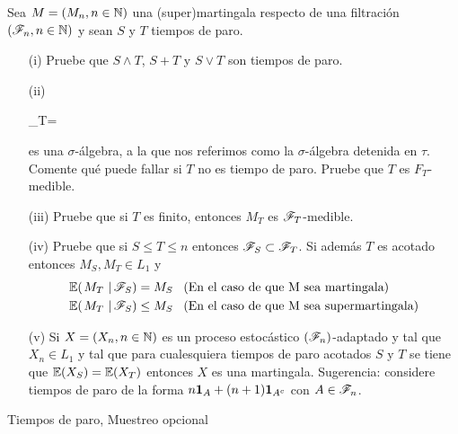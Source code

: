 \begin{problema}
	Sea $M=\left( M_n,n\in\mathbb{N}\right) $ una (super)martingala respecto de una filtraci\'on $\left( \mathscr{F}_n,n\in\mathbb{N}\right) $ y sean $S$ y $T$ tiempos de paro.
	
\begin{enumerate}
                \item[(i)] 
                	Pruebe que $S\wedge T$, $S+T$ y $S\vee T$ son tiempos de paro.
                
                \item[(ii)] 
                	\begin{esn}
                		\F_T=
                	\end{esn}
                	es una $\sigma$-\'algebra, a la que nos referimos como la $\sigma$-\'algebra 
                	detenida en $\tau$. Comente qu\'e puede fallar si $T$ no es tiempo de paro. 
                	Pruebe que $T$ es $F_T$-medible. 
                
                \item[(iii)] 
                	Pruebe que si $T$ es finito, entonces $M_T$ es $\mathscr{F}_T$-medible.
                
                \item[(iv)] 
                	Pruebe que si $S\leq T\leq n$ entonces $\mathscr{F}_S\subset\mathscr{F}_T$. Si adem\'as $T$ es acotado entonces $M_S, M_T\in L_1$ y 
                	\begin{align*}
						\espc{M_T}{\F_S} = M_S &\mbox{\;\;\;(En el caso de que M sea martingala)} \\
						\espc{M_T}{\F_S}\leq M_S &\mbox{\;\;\;(En el caso de que M sea supermartingala)}                 	
                	\end{align*}

                \item[(v)] 
                	Si $X=\left( X_n,n\in\mathbb{N}\right) $ es un proceso estoc\'astico $\left( \mathscr{F}_n\right) $-adaptado y tal que $X_n\in L_1$ y tal que 
                	para cualesquiera tiempos de paro acotados $S$ y $T$ se tiene que $\mathbb{E}\! \left( X_S \right)=\mathbb{E}\! \left( X_T \right)$ entonces $X$ es una 
                	martingala. Sugerencia: considere tiempos de paro de la forma $n{\bf{1}}_{A}+(n+1){\bf{1}}_{A^c}$ con $A\in\mathscr{F}_n$.
\end{enumerate}

Tiempos de paro, Muestreo opcional
\end{problema}

